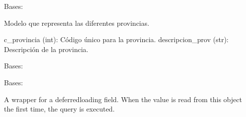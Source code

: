 \documentclass[letterpaper,10pt,spanish]{sphinxmanual}
\begin{document}
\begin{fulllineitems}

\pysigstartsignatures
{}
\pysigstopsignatures
\sphinxAtStartPar
Bases: 

\sphinxAtStartPar
Modelo que representa las diferentes provincias.
\begin{description}
\sphinxAtStartPar
c\_provincia (int): Código único para la provincia.
descripcion\_prov (str): Descripción de la provincia.

\end{description}


\begin{fulllineitems}

\pysigstartsignatures
{}
\pysigstopsignatures
\sphinxAtStartPar
Bases: 

\end{fulllineitems}



\begin{fulllineitems}

\pysigstartsignatures
{}
\pysigstopsignatures
\sphinxAtStartPar
Bases: 

\end{fulllineitems}



\begin{fulllineitems}

\pysigstartsignatures
{}
\pysigstopsignatures
\sphinxAtStartPar
A wrapper for a deferred\sphinxhyphen{}loading field. When the value is read from this
object the first time, the query is executed.

\end{fulllineitems}



\begin{fulllineitems}


\end{fulllineitems}
\end{fulllineitems}
\end{document}
